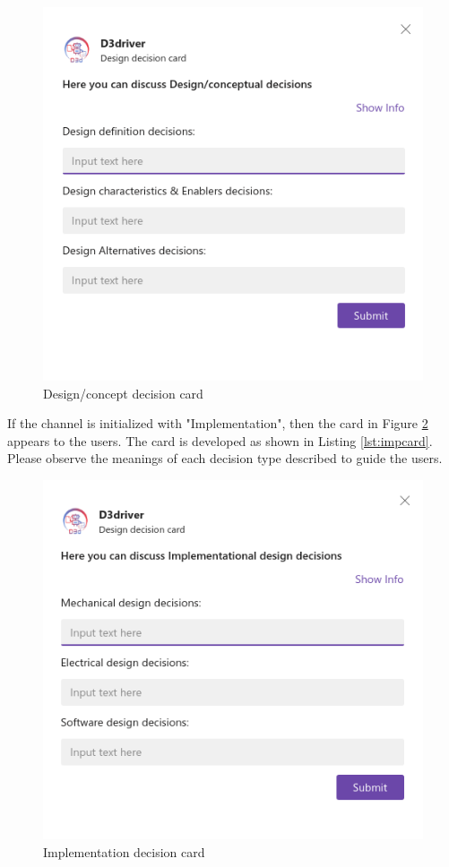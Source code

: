 \begin{figure}[h]
\centering
\includegraphics[width=0.7\linewidth]{figures/dc}
\captionsetup{justification=centering}
\caption{Design/concept decision card}
\label{fig:dc}
\end{figure}

If the channel is initialized with "Implementation", then the card in Figure \ref{fig:imp} appears to the users. The card is developed as shown in Listing \ref{lst:impcard}. Please observe the meanings of each decision type described to guide the users.
\begin{figure}[h]
\centering
\includegraphics[width=0.6\linewidth]{figures/imp}
\captionsetup{justification=centering}
\caption{Implementation decision card}
\label{fig:imp}
\end{figure}

